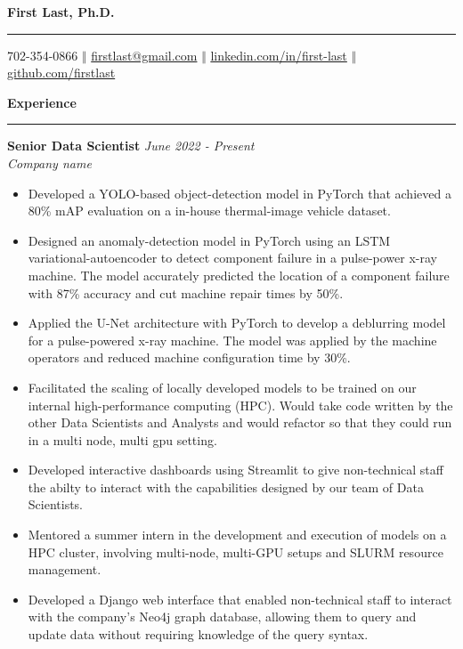 \documentclass[11pt]{article}
\begin{document}
\thispagestyle{empty}

\begin{center}
  \bf \Huge  First Last, Ph.D.
  \vspace{.1em}
  \hrule
\end{center}

\begin{center}
  \vspace{.4em}
  702-354-0866 $\Big \Vert$
  \href{mailto:firstlast@gmail.com}{firstlast@gmail.com} $\Big \Vert$ 
  \href{https://www.linkedin.com/in/first-last/}{linkedin.com/in/first-last} $\Big \Vert$
  \href{https://github.com/firstlast}{github.com/firstlast}
\end{center}

\textbf{\Large Experience}
\vspace{.3em}
\hrule
\vspace{.3em}

\textbf{\large Senior Data Scientist} \hfill \textit{June 2022 - Present}\\
\textit{Company name} 

\begin{itemize} \setlength\itemsep{-0.5em}
  \item Developed a YOLO-based object-detection model in PyTorch that achieved a 
    80\% mAP evaluation on a in-house thermal-image vehicle dataset. 

  \item Designed an anomaly-detection model in PyTorch using an LSTM 
    variational-autoencoder to detect component failure in a pulse-power x-ray 
    machine. The model accurately predicted the location of a component failure with 
    87\% accuracy and cut machine repair times by 50\%.

  \item Applied the U-Net architecture with PyTorch to develop a deblurring model for 
    a pulse-powered x-ray machine. The model was applied by the machine operators 
    and reduced machine configuration time by 30\%.

  \item Facilitated the scaling of locally developed models to be trained on our internal
    high-performance computing (HPC). Would take code written by the other 
    Data Scientists and Analysts and would refactor so that they could run in a 
    multi node, multi gpu setting. 

  \item Developed interactive dashboards using Streamlit to give non-technical staff the
    abilty to interact with the capabilities designed by our team of Data Scientists.

  \item Mentored a summer intern in the development and execution of models on a 
    HPC cluster, involving multi-node, multi-GPU setups and SLURM resource management.

  \item Developed a Django web interface that enabled non-technical staff to 
    interact with the company's Neo4j graph database, allowing them to query and 
    update data without requiring knowledge of the query syntax.

\end{itemize}
\end{document}
